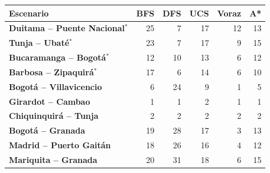 \renewcommand{\arraystretch}{1.2}
\begin{tabular}{|l|r|r|r|r|r|}
\hline
\rowcolor{gray!20} \textbf{Escenario} & \textbf{BFS} & \textbf{DFS} & \textbf{UCS} & \textbf{Voraz} & \textbf{A*} \\
\hline
\textbf{Duitama -- Puente Nacional$^{*}$} & 25 & 7 & 17 & 12 & 13 \\
\hline
\textbf{Tunja -- Ubaté$^{*}$} & 23 & 7 & 17 & 9 & 15 \\
\hline
\textbf{Bucaramanga -- Bogotá$^{*}$} & 12 & 10 & 13 & 6 & 12 \\
\hline
\textbf{Barbosa -- Zipaquirá$^{*}$} & 17 & 6 & 14 & 6 & 10 \\
\hline
\textbf{Bogotá -- Villavicencio} & 6 & 24 & 9 & 1 & 5 \\
\hline
\textbf{Girardot -- Cambao} & 1 & 1 & 2 & 1 & 1 \\
\hline
\textbf{Chiquinquirá -- Tunja} & 2 & 2 & 2 & 2 & 2 \\
\hline
\textbf{Bogotá -- Granada} & 19 & 28 & 17 & 3 & 13 \\
\hline
\textbf{Madrid -- Puerto Gaitán} & 18 & 26 & 16 & 4 & 12 \\
\hline
\textbf{Mariquita -- Granada} & 20 & 31 & 18 & 6 & 15 \\
\hline
\end{tabular}
